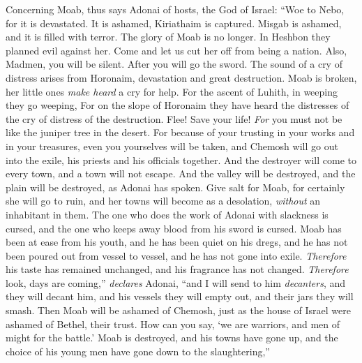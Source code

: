 \begin{biblechapter} %
 Concerning Moab, thus says Adonai of hosts, the God of Israel:
\verse “Woe to Nebo, 
for it is devastated. 
It is ashamed, 
Kiriathaim is captured. 
Misgab is ashamed, 
and it is filled with terror.
\verse The glory of Moab is no longer. 
In Heshbon they planned evil against her. 
Come and let us cut her off from being a nation. 
Also, Madmen, you will be silent. 
After you will go the sword.
\verse The sound of a cry of distress arises from Horonaim, 
devastation and great destruction.
\verse Moab is broken, 
her little ones \textit{make heard} a cry for help.
\verse For the ascent of Luhith, 
in weeping they go weeping, 
For on the slope of Horonaim they have heard 
the distresses of the cry of distress of the destruction.
\verse Flee! Save your life! 
\textit{For} you must not be like the juniper tree in the desert.
\verse For because of your trusting in your works and in your treasures, 
even you yourselves will be taken, 
and Chemosh will go out into the exile, 
his priests and his officials together.
\verse And the destroyer will come to every town, 
and a town will not escape. 
And the valley will be destroyed, 
and the plain will be destroyed, as Adonai has spoken.
\verse Give salt for Moab, 
for certainly she will go to ruin, 
and her towns will become as a desolation, 
\textit{without} an inhabitant in them.
\verse The one who does the work of Adonai with slackness is cursed, 
and the one who keeps away blood from his sword is cursed.
\verse Moab has been at ease from his youth, 
and he has been quiet on his dregs, 
and he has not been poured out from vessel to vessel, 
and he has not gone into exile. 
\textit{Therefore} his taste has remained unchanged, 
and his fragrance has not changed.
\verse \textit{Therefore} look, days are coming,” \textit{declares} Adonai, 
“and I will send to him \textit{decanters}, 
and they will decant him, 
and his vessels they will empty out, 
and their jars they will smash.
\verse Then Moab will be ashamed of Chemosh, 
just as the house of Israel were ashamed of Bethel, their trust.
\verse How can you say, ‘we are warriors, 
and men of might for the battle.’
\verse Moab is destroyed, 
and his towns have gone up, 
and the choice of his young men have gone down to the slaughtering,” 

\end{biblechapter}
